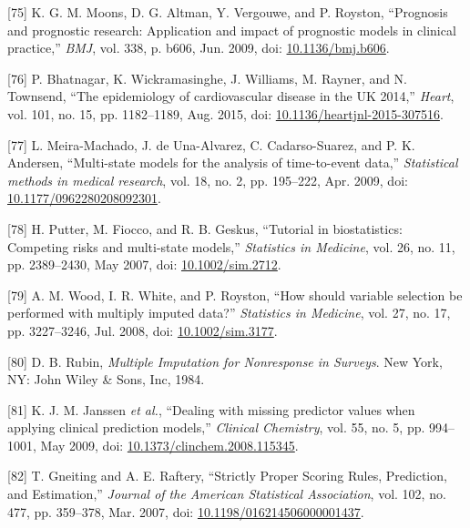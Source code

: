 \documentclass[
]{article}
\newenvironment{cslreferences}%
  {}%
  {\par}
\begin{document}
\begin{cslreferences}
\leavevmode\hypertarget{ref-moons_prognosis_2009-1}{}%
{[}75{]} K. G. M. Moons, D. G. Altman, Y. Vergouwe, and P. Royston, ``Prognosis and prognostic research: Application and impact of prognostic models in clinical practice,'' \emph{BMJ}, vol. 338, p. b606, Jun. 2009, doi: \href{https://doi.org/10.1136/bmj.b606}{10.1136/bmj.b606}.

\leavevmode\hypertarget{ref-bhatnagar_epidemiology_2015}{}%
{[}76{]} P. Bhatnagar, K. Wickramasinghe, J. Williams, M. Rayner, and N. Townsend, ``The epidemiology of cardiovascular disease in the UK 2014,'' \emph{Heart}, vol. 101, no. 15, pp. 1182--1189, Aug. 2015, doi: \href{https://doi.org/10.1136/heartjnl-2015-307516}{10.1136/heartjnl-2015-307516}.

\leavevmode\hypertarget{ref-meira-machado_multi-state_2009}{}%
{[}77{]} L. Meira-Machado, J. de Una-Alvarez, C. Cadarso-Suarez, and P. K. Andersen, ``Multi-state models for the analysis of time-to-event data,'' \emph{Statistical methods in medical research}, vol. 18, no. 2, pp. 195--222, Apr. 2009, doi: \href{https://doi.org/10.1177/0962280208092301}{10.1177/0962280208092301}.

\leavevmode\hypertarget{ref-putter_tutorial_2007}{}%
{[}78{]} H. Putter, M. Fiocco, and R. B. Geskus, ``Tutorial in biostatistics: Competing risks and multi-state models,'' \emph{Statistics in Medicine}, vol. 26, no. 11, pp. 2389--2430, May 2007, doi: \href{https://doi.org/10.1002/sim.2712}{10.1002/sim.2712}.

\leavevmode\hypertarget{ref-wood_how_2008}{}%
{[}79{]} A. M. Wood, I. R. White, and P. Royston, ``How should variable selection be performed with multiply imputed data?'' \emph{Statistics in Medicine}, vol. 27, no. 17, pp. 3227--3246, Jul. 2008, doi: \href{https://doi.org/10.1002/sim.3177}{10.1002/sim.3177}.

\leavevmode\hypertarget{ref-rubin_multiple_1984}{}%
{[}80{]} D. B. Rubin, \emph{Multiple Imputation for Nonresponse in Surveys}. New York, NY: John Wiley \& Sons, Inc, 1984.

\leavevmode\hypertarget{ref-janssen_dealing_2009}{}%
{[}81{]} K. J. M. Janssen \emph{et al.}, ``Dealing with missing predictor values when applying clinical prediction models,'' \emph{Clinical Chemistry}, vol. 55, no. 5, pp. 994--1001, May 2009, doi: \href{https://doi.org/10.1373/clinchem.2008.115345}{10.1373/clinchem.2008.115345}.

\leavevmode\hypertarget{ref-gneiting_strictly_2007}{}%
{[}82{]} T. Gneiting and A. E. Raftery, ``Strictly Proper Scoring Rules, Prediction, and Estimation,'' \emph{Journal of the American Statistical Association}, vol. 102, no. 477, pp. 359--378, Mar. 2007, doi: \href{https://doi.org/10.1198/016214506000001437}{10.1198/016214506000001437}.


\end{cslreferences}
\end{document}
